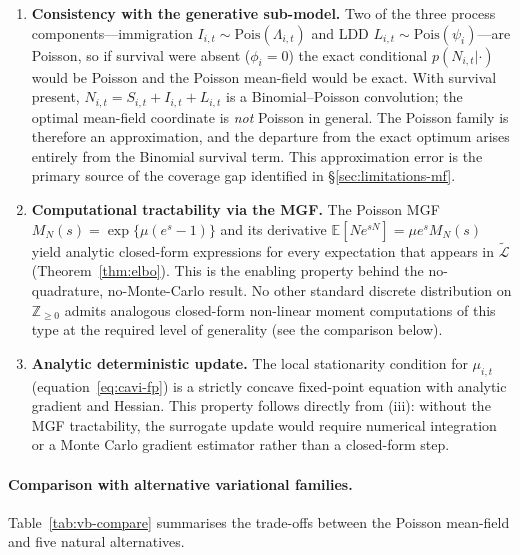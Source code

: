 \documentclass[review,12pt]{elsarticle}
\theoremstyle{definition}
\begin{document}
\begin{enumerate}[label=(\roman*)]
\item \textbf{Consistency with the generative sub-model.}  Two of the three process
  components---immigration $I_{i,t}\sim\mathrm{Pois}(\Lambda_{i,t})$ and LDD
  $L_{i,t}\sim\mathrm{Pois}(\psi_i)$---are Poisson, so if survival were absent
  ($\phi_i=0$) the exact conditional $p(N_{i,t}|\cdot)$ would be Poisson
  and the Poisson mean-field would be exact.
  With survival present, $N_{i,t}=S_{i,t}+I_{i,t}+L_{i,t}$ is a
  Binomial--Poisson convolution; the optimal mean-field coordinate is
  \emph{not} Poisson in general.  The Poisson family is therefore
  an approximation, and the departure from the exact optimum arises entirely
  from the Binomial survival term.  This approximation error is the primary
  source of the coverage gap identified in \S\ref{sec:limitations-mf}.

\item \textbf{Computational tractability via the MGF.}  The Poisson MGF
  $M_N(s)=\exp\{\mu(e^s-1)\}$ and its derivative $\mathbb{E}[Ne^{sN}]
  =\mu e^s M_N(s)$ yield analytic closed-form expressions for every
  expectation that appears in $\tilde{\mathcal{L}}$ (Theorem~\ref{thm:elbo}).
  This is the enabling property behind the no-quadrature, no-Monte-Carlo
  result.  No other standard discrete distribution on $\mathbb{Z}_{\ge0}$
  admits analogous closed-form non-linear moment computations of this type
  at the required level of generality (see the comparison below).

\item \textbf{Analytic deterministic update.}  The local stationarity condition
  for $\mu_{i,t}$ (equation~\eqref{eq:cavi-fp}) is a strictly concave
  fixed-point equation with analytic gradient and Hessian.  This property
  follows directly from (iii): without the MGF tractability, the surrogate
  update would require numerical integration or a Monte Carlo gradient
  estimator rather than a closed-form step.
\end{enumerate}

\paragraph{Comparison with alternative variational families.}
Table~\ref{tab:vb-compare} summarises the trade-offs between the Poisson
mean-field and five natural alternatives.
\end{document}
